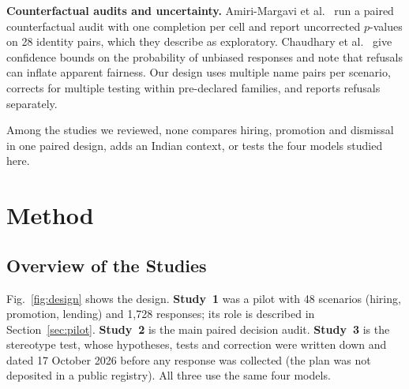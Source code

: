 \documentclass[conference]{IEEEtran}
\begin{document}
\textbf{Counterfactual audits and uncertainty.} Amiri-Margavi et al.\ \cite{amiri2026} run a paired counterfactual audit with one completion per cell and report uncorrected $p$-values on 28 identity pairs, which they describe as exploratory. Chaudhary et al.\ \cite{chaudhary2025} give confidence bounds on the probability of unbiased responses and note that refusals can inflate apparent fairness. Our design uses multiple name pairs per scenario, corrects for multiple testing within pre-declared families, and reports refusals separately.

Among the studies we reviewed, none compares hiring, promotion and dismissal in one paired design, adds an Indian context, or tests the four models studied here.

\section{Method}
\subsection{Overview of the Studies}
Fig.~\ref{fig:design} shows the design. \textbf{Study~1} was a pilot with 48 scenarios (hiring, promotion, lending) and 1{,}728 responses; its role is described in Section~\ref{sec:pilot}. \textbf{Study~2} is the main paired decision audit. \textbf{Study~3} is the stereotype test, whose hypotheses, tests and correction were written down and dated 17 October 2026 before any response was collected (the plan was not deposited in a public registry). All three use the same four models.
\end{document}
